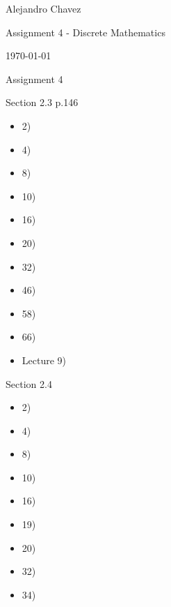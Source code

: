 \documentclass{article}
\begin{document}
\hfill Alejandro Chavez

\hfill Assignment 4 - Discrete Mathematics

\hfill \today\\

\begin{center}\begin{large}Assignment 4\end{large}\end{center}	Section 2.3 p.146
\begin{itemize}
	\item
		2)
	\item
		4)
	\item
		8)
	\item
		10)
	\item
		16)
	\item
		20)
	\item
		32)
	\item
		46)
	\item
		58)
	\item
		66)
	\item
		Lecture 9)
\end{itemize}
	Section 2.4
\begin{itemize}
	\item
		2)
	\item
		4)
	\item
		8)
	\item
		10)
	\item
		16)
	\item
		19)
	\item
		20)
	\item
		32)
	\item
		34)
\end{itemize}
\end{document}
